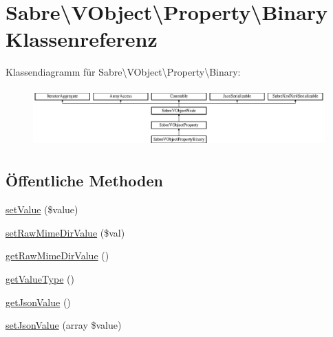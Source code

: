 \hypertarget{class_sabre_1_1_v_object_1_1_property_1_1_binary}{}\section{Sabre\textbackslash{}V\+Object\textbackslash{}Property\textbackslash{}Binary Klassenreferenz}
\label{class_sabre_1_1_v_object_1_1_property_1_1_binary}
Klassendiagramm für Sabre\textbackslash{}V\+Object\textbackslash{}Property\textbackslash{}Binary\+:\begin{figure}[H]
\begin{center}
\leavevmode
\includegraphics[height=2.262626cm]{class_sabre_1_1_v_object_1_1_property_1_1_binary}
\end{center}
\end{figure}
\subsection*{Öffentliche Methoden}
\begin{DoxyCompactItemize}
\item 
\mbox{\hyperlink{class_sabre_1_1_v_object_1_1_property_1_1_binary_a39ac950bc47a3f0ffed4a9f10ad2c972}{set\+Value}} (\$value)
\item 
\mbox{\hyperlink{class_sabre_1_1_v_object_1_1_property_1_1_binary_ac1b4d53f37a78815d7205e6c1eff3e19}{set\+Raw\+Mime\+Dir\+Value}} (\$val)
\item 
\mbox{\hyperlink{class_sabre_1_1_v_object_1_1_property_1_1_binary_a03c7f7e0a75e521e5484e0be7c29ef92}{get\+Raw\+Mime\+Dir\+Value}} ()
\item 
\mbox{\hyperlink{class_sabre_1_1_v_object_1_1_property_1_1_binary_ad868ea901d8b934c7a8209a9b4830849}{get\+Value\+Type}} ()
\item 
\mbox{\hyperlink{class_sabre_1_1_v_object_1_1_property_1_1_binary_af8df06094c2b594cf0a9fa60bc156ed3}{get\+Json\+Value}} ()
\item 
\mbox{\hyperlink{class_sabre_1_1_v_object_1_1_property_1_1_binary_a574fd72d52540ea0c8290cc116d9b8a6}{set\+Json\+Value}} (array \$value)
\end{DoxyCompactItemize}
